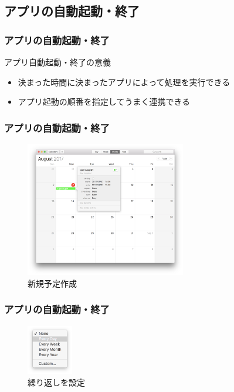 \documentclass[10pt, dvipdfmx]{beamer}
\begin{document}
    \subsection{アプリの自動起動・終了}
        \begin{frame}
            \frametitle{アプリの自動起動・終了}
            \begin{block}{アプリ自動起動・終了の意義}
                \begin{itemize}
                    \item 決まった時間に決まったアプリによって処理を実行できる
                    \item アプリ起動の順番を指定してうまく連携できる
                \end{itemize}
            \end{block}
        \end{frame}

        \begin{frame}
            \frametitle{アプリの自動起動・終了}
                \begin{figure}[htb]
                    \includegraphics[width=70mm]{images/app-1.png}
                    \caption{新規予定作成}
                    \label{fig:08}
                \end{figure}
        \end{frame}

        \begin{frame}
            \frametitle{アプリの自動起動・終了}
                \begin{figure}[htb]
                    \includegraphics[width=20mm]{images/app-2.png}
                    \caption{繰り返しを設定}
                    \label{fig:09}
                \end{figure}
        \end{frame}
\end{document}

